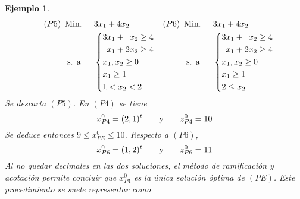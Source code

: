 \documentclass[11pt]{report}
\def\textA{
\scriptsize{$\begin{aligned}[t]
    x^0_{PR} &= (0.8,1.6)^t \\
    z^0_{PR} &= 8.8
\end{aligned}$}
\nodepart{two}
{\scriptsize{$9 \leq z^0_{PE}$}}
}
\def\textC{
\scriptsize{$\begin{aligned}[t]
    x^0_{P1} &= (0,4)^t \\
    z^0_{P1} &= 16
\end{aligned}$}
\nodepart{two}
{\scriptsize{$9 \leq z^0_{PE} \leq 16$}}
}
\def\textD{
\scriptsize{$\begin{aligned}[t]
    x^0_{P3} &= (1,1.5)^t \\
    z^0_{P3} &= 9
\end{aligned}$}
}
\def\textE{
\scriptsize{$\begin{aligned}[t]
    x^0_{P4} &= (2,1)^t \\
    z^0_{P4} &= 10
\end{aligned}$}
\nodepart{two}
{\scriptsize{$9 \leq z^0_{PE} \leq 10$}}
}
\def\textF{
\scriptsize{$\begin{aligned}[t]
    x^0_{P6} &= (1,2)^t \\
    z^0_{P6} &= 11
\end{aligned}$}
}
\theoremstyle{mytheorem}
\theoremstyle{mydefinition}
\theoremstyle{myexample}
\newtheorem*{example}{Ejemplo}
\begin{document}
\begin{example}
\[\begin{aligned}[t]
\end{aligned} \quad \begin{aligned}[t]
(P5)\ \,&\text{Min. } && 3x_1+4x_2 \\
& \; \text{s. a} &&\left\{\begin{alignedat}{10}
& 3&x_1 & {}+{} &  &x_2 & {}\geq{} &4 \\
&  &x_1 & {}+{} & 2&x_2 & {}\geq{} &4 \\
&\mathrlap{x_1,x_2 \geq 0} \\
&\mathrlap{x_1 \geq 1} \\
&\mathrlap{1 < x_2 < 2} \\
\end{alignedat}\right.
\end{aligned} \quad \begin{aligned}[t]
(P6)\ \,&\text{Min. } && 3x_1+4x_2 \\
& \; \text{s. a} &&\left\{\begin{alignedat}{10}
& 3&x_1 & {}+{} &  &x_2 & {}\geq{} &4 \\
&  &x_1 & {}+{} & 2&x_2 & {}\geq{} &4 \\
&\mathrlap{x_1,x_2 \geq 0} \\
&\mathrlap{x_1 \geq 1} \\
&\mathrlap{2 \leq x_2} \\
\end{alignedat}\right.
\end{aligned}\]
Se descarta $(P5)$. En $(P4)$ se tiene
\[x^0_{P4} = (2,1)^t \qquad \textup{y} \qquad z^0_{P4} = 10\]
Se deduce entonces $9 \leq x^0_{PE} \leq 10$. Respecto a $(P6)$,
\[x^0_{P6} = (1,2)^t \qquad \textup{y} \qquad z^0_{P6} = 11\]
Al no quedar decimales en las dos soluciones, el método de ramificación y acotación permite concluir que $x^0_{P4}$ es la única solución óptima de $(PE)$. Este procedimiento se suele representar como

\hfill

\begin{center}
\end{center}


\end{example}
\end{document}
